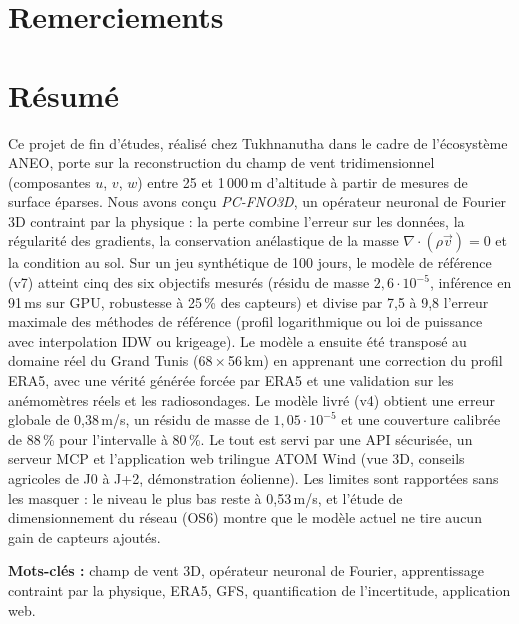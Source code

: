 \chapter*{Remerciements}

\chapter*{Résumé}
Ce projet de fin d'études, réalisé chez Tukhnanutha dans le cadre de l'écosystème ANEO, porte sur
la reconstruction du champ de vent tridimensionnel (composantes $u$, $v$, $w$) entre 25 et 1\,000\,m
d'altitude à partir de mesures de surface éparses. Nous avons conçu \emph{PC-FNO3D}, un opérateur
neuronal de Fourier 3D contraint par la physique : la perte combine l'erreur sur les données, la
régularité des gradients, la conservation anélastique de la masse $\nabla\cdot(\rho\vec{v})=0$ et
la condition au sol. Sur un jeu synthétique de 100 jours, le modèle de référence (v7) atteint
cinq des six objectifs mesurés (résidu de masse $2{,}6\cdot10^{-5}$, inférence en 91\,ms sur GPU,
robustesse à 25\,\% des capteurs) et divise par 7,5 à 9,8 l'erreur maximale des méthodes de
référence (profil logarithmique ou loi de puissance avec interpolation IDW ou krigeage). Le modèle a
ensuite été transposé au domaine réel du Grand Tunis (68\,$\times$\,56\,km) en apprenant une
correction du profil ERA5, avec une vérité générée forcée par ERA5 et une validation sur les
anémomètres réels et les radiosondages. Le modèle livré (v4) obtient une erreur globale de
0,38\,m/s, un résidu de masse de $1{,}05\cdot10^{-5}$ et une couverture calibrée de 88\,\% pour
l'intervalle à 80\,\%. Le tout est servi par une API sécurisée, un serveur MCP et l'application
web trilingue ATOM Wind (vue 3D, conseils agricoles de J0 à J+2, démonstration éolienne). Les
limites sont rapportées sans les masquer : le niveau le plus bas reste à 0,53\,m/s, et l'étude de
dimensionnement du réseau (OS6) montre que le modèle actuel ne tire aucun gain de capteurs ajoutés.

\noindent\textbf{Mots-clés :} champ de vent 3D, opérateur neuronal de Fourier, apprentissage
contraint par la physique, ERA5, GFS, quantification de l'incertitude, application web.

